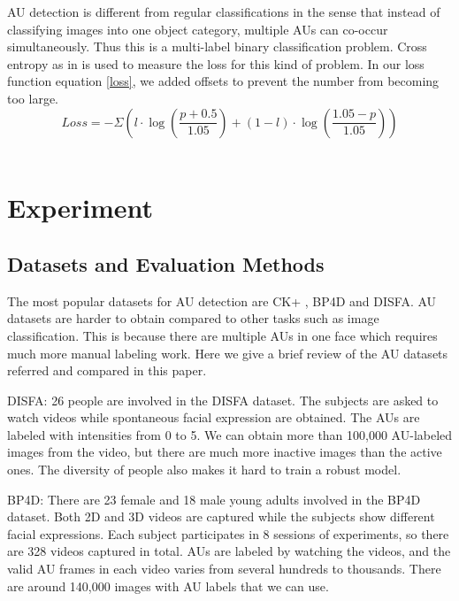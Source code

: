 \documentclass[a4paper, 10pt, conference]{ieeeconf}      %
\begin{document}
AU detection is different from regular classifications in the sense that instead of classifying images into one object category, multiple AUs can co-occur simultaneously. Thus this is a multi-label binary classification problem. Cross entropy as in \cite{p22} is used to measure the loss for this kind of problem.  In our loss function equation \ref{loss}, we added offsets to prevent the number from becoming too large.
\begin{equation}
\label{loss}
Loss=-\Sigma(l\cdot\log(\frac{p+0.5}{1.05})+(1-l)\cdot\log(\frac{1.05-p}{1.05}))
\end{equation}\
\section{Experiment}

\subsection{Datasets  and Evaluation Methods}

The most popular datasets for AU detection are CK+ \cite{p28}, BP4D\cite{p27} and DISFA\cite{p29}. AU datasets are harder to obtain compared to other tasks such as image classification. This is because there are multiple AUs in one face which requires much more manual labeling work. Here we give a brief review of the AU datasets referred and compared in this paper.

DISFA: 26 people are involved in the DISFA dataset. The subjects are asked to watch videos while spontaneous facial expression are obtained. The AUs are labeled with intensities from 0 to 5. We can obtain more than 100,000 AU-labeled images from the video, but there are much more inactive images than the active ones. The diversity of people also makes it hard to train a robust model.

BP4D:  There are 23 female and 18 male young adults involved in the BP4D dataset. Both 2D and 3D videos are captured while the subjects show different facial expressions. Each subject participates in 8 sessions of experiments, so there are 328 videos captured in total. AUs are labeled by watching the videos, and the valid AU frames in each video varies from several hundreds to thousands. There are around 140,000 images with AU labels that we can use.
\end{document}
